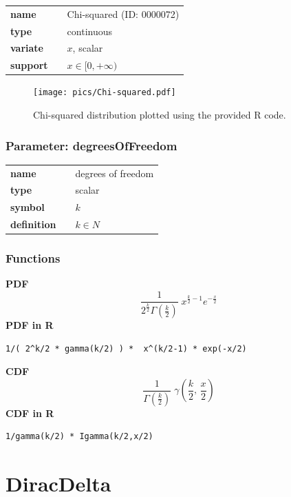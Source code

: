 \documentclass{article}
\begin{document}
  \bigskip 

\begin{tabular}{p{2cm}cl}
\textbf{name} & & Chi-squared (ID: 0000072)\\ 
 
\textbf{type} & & continuous \\ 

\textbf{variate} & & $x$, scalar \\ 

\textbf{support} & & $x \in [0,+\infty)$
\end{tabular}

\begin{figure}[ht!]
\centering
  \texttt{[image: pics/Chi-squared.pdf]}
 \caption{Chi-squared distribution plotted using the provided R code.}
 \label{fig:Chi-squared}
\end{figure}

\subsubsection*{Parameter: degreesOfFreedom}

\noindent\begin{tabular}{p{2cm}cl}
\textbf{name} & & degrees of freedom \\
\textbf{type} & & scalar \\
\textbf{symbol} & & $k$  \\
\textbf{definition} & & $k \in N$
\end{tabular}
\subsubsection*{Functions}

\smallskip \noindent \hspace{.2cm} \textbf{PDF} 
\begin{equation*}\frac{1}{2^{\frac{k}{2}}\Gamma\left(\frac{k}{2}\right)}\; x^{\frac{k}{2}-1} e^{-\frac{x}{2}}\end{equation*}
\smallskip \noindent \hspace{.2cm} \textbf{PDF in R}  
\begin{verbatim}1/( 2^k/2 * gamma(k/2) ) *  x^(k/2-1) * exp(-x/2)\end{verbatim}
\smallskip \noindent \hspace{.2cm} \textbf{CDF} 
\begin{equation*}\frac{1}{\Gamma\left(\frac{k}{2}\right)}\; \gamma\left(\frac{k}{2},\,\frac{x}{2}\right)\end{equation*}
\smallskip \noindent \hspace{.2cm} \textbf{CDF in R} 
\begin{verbatim}1/gamma(k/2) * Igamma(k/2,x/2)\end{verbatim}
\smallskip\section*{DiracDelta} 
\end{document}
